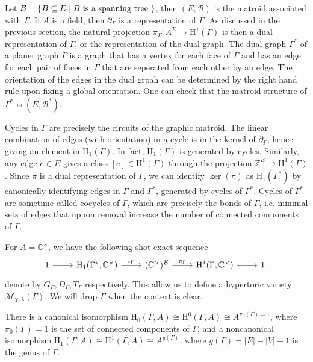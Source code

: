 \documentclass[b5paper]{article}
\newcommand{\BB}{\mathcal{B}}
\newcommand{\ZZ}{\mathbb{Z}}
\newcommand{\MM}{\mathcal{M}}
\newcommand{\HH}{\mathrm{H}}
\begin{document}
Let $\BB=\CB{B\subseteq E\mid B\textnormal{ is a spanning tree }}$, then $(E,\BB)$ is the matroid associated with $\Gamma$. If $A$ is a field, then $\partial_\Gamma$ is a representation of $\Gamma$. As discussed in the previous section, the natural projection $\pi_{\Gamma}:A^E\rightarrow \HH^1(\Gamma)$ is then a dual representation of $\Gamma$, or the representation of the dual graph. The dual graph $\Gamma^*$ of a planer graph $\Gamma$ is a graph that has a vertex for each face of $\Gamma$ and has an edge for each pair of faces in $\Gamma$ that are seperated from each other by an edge. The orientation of the edges in the dual grpah can be determined by the right hand rule upon fixing a global orientation. One can check that the matroid structure of $\Gamma^*$ is $(E,\BB^*)$. 

Cycles in $\Gamma$ are precisely the circuits of the graphic matroid. The linear combination of edges (with orientation) in a cycle is in the kernel of $\partial_\Gamma$, hence giving an element in $\HH_1(\Gamma)$. In fact, $\HH_1(\Gamma)$ is generated by cycles.
Similarly, any edge $e \in E$ gives a class $ [e] \in \HH^1(\Gamma) $ through the projection $ \ZZ^E \to \HH^1(\Gamma) $. 
Since $\pi$ is a dual representation of $\Gamma$, we can identify $\ker(\pi)$ as $\HH_1(\Gamma^*)$ by canonically identifying edges in $\Gamma$ and $\Gamma^*$, generated by cycles of $\Gamma^*$. Cycles of $\Gamma^*$ are sometime called cocycles of $\Gamma$, which are precisely the bonds of $\Gamma$, i.e. minimal sets of edges that uppon removal increase the number of connected components of $\Gamma$.

For $A=\mathbb{C}^\times $, we have the following shot exact sequence
\begin{equation}
  \label{eq:exact_sequence_tori_graph}
    \begin{tikzcd}
      1 \arrow[r] & \HH_1(\Gamma^*,\mathbb{C}^\times ) \arrow[r, "\iota_\Gamma"] & (\mathbb{C}^\times)^E \arrow[r, "\pi_\Gamma"] & \HH^1(\Gamma, \mathbb{C}^\times) \arrow[r] & 1
    \end{tikzcd},
\end{equation}
denote by $G_\Gamma,D_\Gamma,T_\Gamma$ respectively. This allow us to define a hypertoric variety $\MM_{\chi,\lambda}(\Gamma)$. We will drop $\Gamma$ when the context is clear. 

There is a canonical isomorphism $\HH_0(\Gamma, A) \cong \HH^0(\Gamma, A) \cong A^{\pi_0(\Gamma)=1} $, where $\pi_0(\Gamma)=1$ is the set of connected components of $\Gamma$, and a noncanonical isomorphism $ \HH_1(\Gamma, A) \cong \HH^1(\Gamma, A) \cong A^{g(\Gamma)} $, where $g(\Gamma)=|E|-|V|+1$ is the genus of $\Gamma$.
\end{document}
